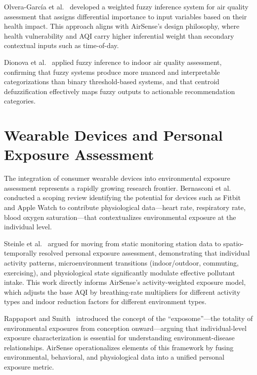 \documentclass[12pt,a4paper]{report}
\begin{document}
Olvera-Garc\'ia et al.~\cite{OlveraGarcia2016weighted} developed a weighted fuzzy inference system for air quality assessment that assigns differential importance to input variables based on their health impact. This approach aligns with AirSense's design philosophy, where health vulnerability and AQI carry higher inferential weight than secondary contextual inputs such as time-of-day.

Dionova et al.~\cite{Dionova2020indoor} applied fuzzy inference to indoor air quality assessment, confirming that fuzzy systems produce more nuanced and interpretable categorizations than binary threshold-based systems, and that centroid defuzzification effectively maps fuzzy outputs to actionable recommendation categories.

\section{Wearable Devices and Personal Exposure Assessment}

The integration of consumer wearable devices into environmental exposure assessment represents a rapidly growing research frontier. Bernasconi et al.~\cite{Bernasconi2022wearables} conducted a scoping review identifying the potential for devices such as Fitbit and Apple Watch to contribute physiological data---heart rate, respiratory rate, blood oxygen saturation---that contextualizes environmental exposure at the individual level.

Steinle et al.~\cite{Steinle2013exposure} argued for moving from static monitoring station data to spatio-temporally resolved personal exposure assessment, demonstrating that individual activity patterns, microenvironment transitions (indoor/outdoor, commuting, exercising), and physiological state significantly modulate effective pollutant intake. This work directly informs AirSense's activity-weighted exposure model, which adjusts the base AQI by breathing-rate multipliers for different activity types and indoor reduction factors for different environment types.

Rappaport and Smith~\cite{Rappaport2010exposome} introduced the concept of the ``exposome''---the totality of environmental exposures from conception onward---arguing that individual-level exposure characterization is essential for understanding environment-disease relationships. AirSense operationalizes elements of this framework by fusing environmental, behavioral, and physiological data into a unified personal exposure metric.
\end{document}
